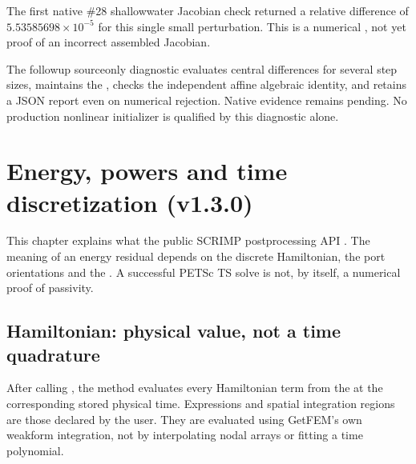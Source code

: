\documentclass[letterpaper,10pt,english]{sphinxmanual}
\begin{document}
\sphinxAtStartPar
The first native \#28 shallow\sphinxhyphen{}water Jacobian check returned
a relative difference of \(5.53585698\times10^{-5}\)
for this single small perturbation. This is a numerical
, not yet proof of
an incorrect assembled Jacobian.

\sphinxAtStartPar
The follow\sphinxhyphen{}up source\sphinxhyphen{}only diagnostic evaluates central
differences for several step sizes, maintains the
, checks the independent
affine algebraic identity, and retains a JSON report
even on numerical rejection. Native evidence remains
pending. No production nonlinear initializer is
qualified by this diagnostic alone.

\sphinxstepscope


\section{Energy, powers and time discretization (v1.3.0)}
\label{\detokenize{energy_and_power:energy-powers-and-time-discretization-v1-3-0}}\label{\detokenize{energy_and_power::doc}}
\sphinxAtStartPar
This chapter explains what the public SCRIMP post\sphinxhyphen{}processing API . The meaning of an energy residual depends on the discrete
Hamiltonian, the port orientations and the . A successful
PETSc TS solve is not, by itself, a numerical proof of passivity.


\subsection{Hamiltonian: physical value, not a time quadrature}
\label{\detokenize{energy_and_power:hamiltonian-physical-value-not-a-time-quadrature}}
\sphinxAtStartPar
After calling {\hyperref[\detokenize{scrimp:scrimp.dphs.DPHS.solve}]{}}, the method
{\hyperref[\detokenize{scrimp:scrimp.dphs.DPHS.compute_Hamiltonian}]{}} evaluates every Hamiltonian
term from the  at the corresponding
stored physical time. Expressions and spatial integration regions are those
declared by the user. They are evaluated using GetFEM’s own weak\sphinxhyphen{}form
integration, not by interpolating nodal arrays or fitting a time polynomial.
\end{document}
